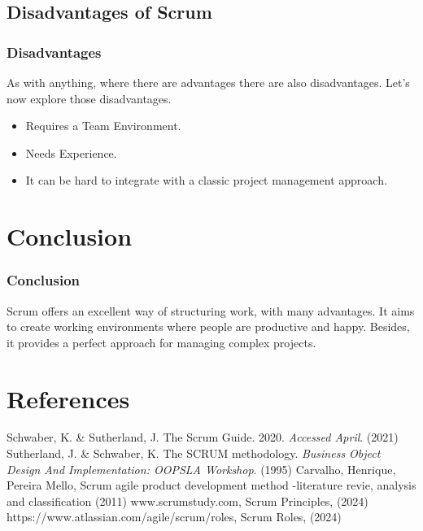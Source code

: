 \documentclass[
	11pt, %
]{beamer}
\begin{document}
\subsection{Disadvantages of Scrum}
\begin{frame}
	\frametitle{Disadvantages}
	As with anything, where there are advantages there are also disadvantages.
	Let's now explore those disadvantages.
	\newline

	\begin{itemize}
		\item Requires a Team Environment.
		\item Needs Experience.
		\item It can be hard to integrate with a classic project management approach.
	\end{itemize}
\end{frame}


\section{Conclusion}

\begin{frame}
	\frametitle{Conclusion}
	Scrum offers an excellent way of structuring work, with many advantages.
	It aims to create working environments where people are productive and happy.
	Besides, it provides a perfect approach for managing complex projects.
\end{frame}

\section{References}

\begin{frame}[allowframebreaks] %
	\begin{thebibliography}{91}
		Schwaber, K. \& Sutherland, J. The Scrum Guide. 2020. {\em Accessed April}. (2021)
		Sutherland, J. \& Schwaber, K. The SCRUM methodology. {\em Business Object Design And Implementation: OOPSLA Workshop}. (1995)
		Carvalho, Henrique, Pereira Mello, Scrum agile product development method -literature revie, analysis and classification (2011)
		 www.scrumstudy.com, Scrum Principles, (2024)
		 https://www.atlassian.com/agile/scrum/roles, Scrum Roles, (2024)
	\end{thebibliography}
\end{frame}
\end{document}
